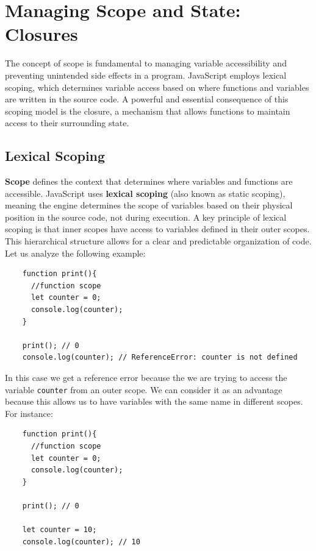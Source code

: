 \documentclass{scrbook}
\begin{document}
\chapter{Managing Scope and State: Closures}

The concept of scope is fundamental to managing variable accessibility and preventing unintended side effects in a program. JavaScript employs lexical scoping, which determines variable access based on where functions and variables are written in the source code. A powerful and essential consequence of this scoping model is the closure, a mechanism that allows functions to maintain access to their surrounding state.

\section{Lexical Scoping}

\textbf{Scope} defines the context that determines where variables and functions are accessible. JavaScript uses \textbf{lexical scoping} (also known as static scoping), meaning the engine determines the scope of variables based on their physical position in the source code, not during execution. A key principle of lexical scoping is that inner scopes have access to variables defined in their outer scopes. This hierarchical structure allows for a clear and predictable organization of code.\\

Let us analyze the following example:
\begin{lstlisting}
    function print(){
      //function scope
      let counter = 0;
      console.log(counter);
    }
    
    print(); // 0
    console.log(counter); // ReferenceError: counter is not defined
\end{lstlisting}

In this case we get a reference error because the we are trying to access the variable \texttt{counter} from an outer scope. We can consider it as an advantage because this allows us to have variables with the same name in different scopes. For instance:
\begin{lstlisting}
    function print(){
      //function scope
      let counter = 0;
      console.log(counter);
    }
    
    print(); // 0
    
    let counter = 10;
    console.log(counter); // 10
\end{lstlisting}
\end{document}
